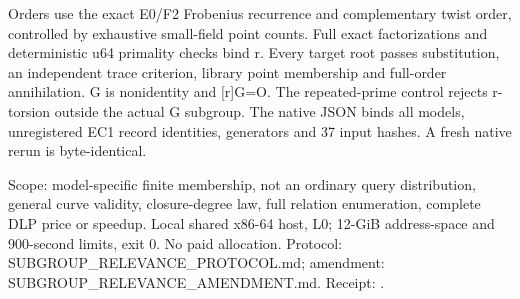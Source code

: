 \documentclass[10pt]{article}
\begin{document}
Orders use the exact E0/F2 Frobenius recurrence and complementary twist
order, controlled by exhaustive small-field point counts. Full exact
factorizations and deterministic u64 primality checks bind r. Every target
root passes substitution, an independent trace criterion, library point
membership and full-order annihilation. G is nonidentity and [r]G=O.
The repeated-prime control rejects r-torsion outside the actual G subgroup.
The native JSON binds all models, unregistered EC1 record identities,
generators and 37 input hashes. A fresh native rerun is byte-identical.

Scope: model-specific finite membership, not an ordinary query distribution,
general curve validity, closure-degree law, full relation enumeration,
complete DLP price or speedup. Local shared x86-64 host, L0; 12-GiB
address-space and 900-second limits, exit 0. No paid allocation.
Protocol: SUBGROUP_RELEVANCE_PROTOCOL.md; amendment: SUBGROUP_RELEVANCE_AMENDMENT.md.
Receipt: .
\end{document}
